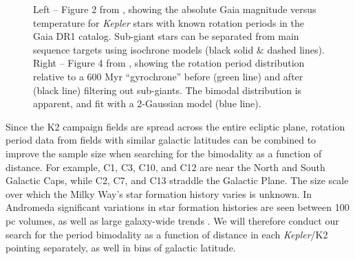 \documentclass[12pt]{article}
\newcommand{\Kepler}{\textsl{Kepler}\xspace}
\begin{document}
\begin{figure}[!th]
\centering
{}
\caption{Left -- Figure 2 from \citet{davenport2017}, showing the absolute Gaia magnitude versus temperature for \Kepler stars with known rotation periods in the Gaia DR1 catalog. Sub-giant stars can be separated from main sequence targets using isochrone models (black solid \& dashed lines). Right -- Figure 4 from \citet{davenport2017}, showing the rotation period distribution relative to a 600 Myr ``gyrochrone'' before (green line) and after (black line) filtering out sub-giants. The bimodal distribution is apparent, and fit with a 2-Gaussian model (blue line).}
\label{fig:cmd}
\end{figure}


Since the K2 campaign fields are spread across the entire ecliptic plane, rotation period data from fields with similar galactic latitudes can be combined to improve the sample size when searching for the bimodality as a function of distance. For example, C1, C3, C10, and C12 are near the North and South Galactic Caps, while C2, C7, and C13 straddle the Galactic Plane. The size scale over which the Milky Way's star formation history varies is unknown. In Andromeda significant variations in star formation histories are seen between 100 pc volumes, as well as large galaxy-wide trends \citep[e.g.][]{lewis2015}. We will therefore conduct our search for the period bimodality as a function of distance in each \Kepler/K2 pointing separately, as well in bins of galactic latitude.
\end{document}
